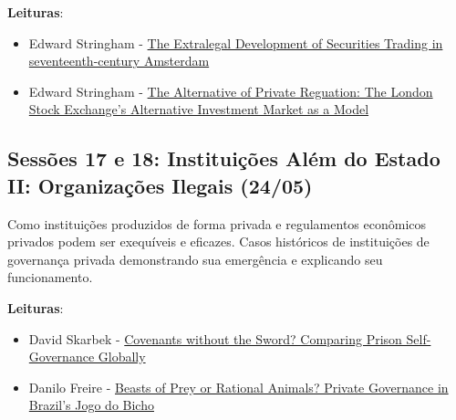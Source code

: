 \documentclass[12pt,]{article}
\providecommand{\tightlist}{%
  \setlength{\itemsep}{0pt}\setlength{\parskip}{0pt}}
\begin{document}
\textbf{Leituras}:

\begin{itemize}
\tightlist
\item
  Edward Stringham -
  \href{https://github.com/danilofreire/eei-omma-ufm/blob/master/sessoes-15-16/stringham-01.pdf}{The
  Extralegal Development of Securities Trading in seventeenth-century
  Amsterdam}
\item
  Edward Stringham -
  \href{https://github.com/danilofreire/eei-omma-ufm/blob/master/sessoes-15-16/stringham-02.pdf}{The
  Alternative of Private Reguation: The London Stock Exchange's
  Alternative Investment Market as a Model}
\end{itemize}

\subsection{Sessões 17 e 18: Instituições Além do Estado II:
Organizações Ilegais
(24/05)}\label{sessoes-17-e-18-instituicoes-alem-do-estado-ii-organizacoes-ilegais-2405}

Como instituições produzidos de forma privada e regulamentos econômicos
privados podem ser exequíveis e eficazes. Casos históricos de
instituições de governança privada demonstrando sua emergência e
explicando seu funcionamento.

\textbf{Leituras}:

\begin{itemize}
\tightlist
\item
  David Skarbek -
  \href{https://github.com/danilofreire/eei-omma-ufm/blob/master/sessoes-17-18/skarbek.pdf}{Covenants
  without the Sword? Comparing Prison Self-Governance Globally}
\item
  Danilo Freire -
  \href{https://github.com/danilofreire/eei-omma-ufm/blob/master/sessoes-17-18/freire.pdf}{Beasts
  of Prey or Rational Animals? Private Governance in Brazil's Jogo do
  Bicho}
\end{itemize}
\end{document}
